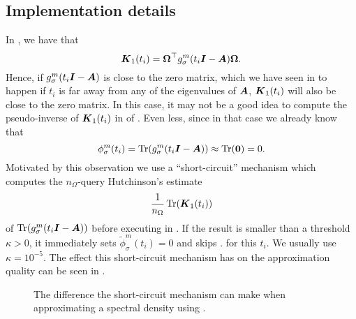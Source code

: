 
\subsection{Implementation details}
\label{subsec:3-nystrom-implementation-details}

In , we have that
\begin{equation}
    \boldsymbol{K}_1(t_i) = \boldsymbol{\Omega}^{\top} g_{\sigma}^m(t_i\boldsymbol{I} - \boldsymbol{A}) \boldsymbol{\Omega}.
    \label{equ:3-nystrom-interpolated-matrix}
\end{equation}
Hence, if $g_{\sigma}^m(t_i\boldsymbol{I} - \boldsymbol{A})$ is close to the zero matrix,
which we have seen in  to happen if
$t_i$ is far away from any of the eigenvalues of $\boldsymbol{A}$, $\boldsymbol{K}_1(t_i)$ will
also be close to the zero matrix. In this case, it may not be a good idea to
compute the pseudo-inverse of $\boldsymbol{K}_1(t_i)$ in 
of . Even less, since in that case we already know that
\begin{equation}
    \phi_{\sigma}^m(t_i) = \operatorname{Tr}(g_{\sigma}^m(t_i\boldsymbol{I} - \boldsymbol{A})) \approx \operatorname{Tr}(\boldsymbol{0}) = 0.
    \label{equ:3-nystrom-short-circuit}
\end{equation}
Motivated by this observation we use a \enquote{short-circuit} mechanism which 
computes the $n_{\Omega}$-query Hutchinson's estimate 
\begin{equation}
    \frac{1}{n_{\Omega}} \operatorname{Tr}(\boldsymbol{K}_1(t_i))
    \label{equ:3-nystrom-short-circuit-hutchinson}
\end{equation}
of $\operatorname{Tr}(g_{\sigma}^m(t_i\boldsymbol{I} - \boldsymbol{A}))$
before executing  in .
If the result is smaller than a threshold $\kappa > 0$, it immediately sets
$\widetilde{\phi}_{\sigma}^m(t_i)=0$ and skips .
for this $t_i$. We usually use $\kappa = 10^{-5}$. The effect this short-circuit
mechanism has on the approximation quality can be seen in .\\

\begin{figure}[ht]
    \centering
    
    \caption{The difference the short-circuit mechanism can make when approximating
        a spectral density using .}
    \label{fig:3-nystrom-short-circuit-mechanism}
\end{figure}

